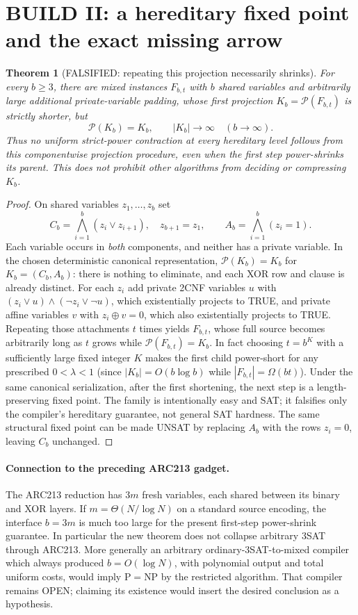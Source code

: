 \documentclass[11pt]{article}
\newtheorem{theorem}{Theorem}
\begin{document}
\section{BUILD II: a hereditary fixed point and the exact missing arrow}
\begin{theorem}[FALSIFIED: repeating this projection necessarily shrinks]
For every $b\ge3$, there are mixed instances $F_{b,t}$ with $b$ shared variables and arbitrarily large additional private-variable padding, whose first projection $K_b=\mathcal P(F_{b,t})$ is strictly shorter, but
\[
 \mathcal P(K_b)=K_b,\qquad |K_b|\longrightarrow\infty\quad(b\to\infty).
\]
Thus no uniform strict-power contraction at \emph{every hereditary level} follows from this componentwise projection procedure, even when the first step power-shrinks its parent. This does not prohibit other algorithms from deciding or compressing $K_b$.
\end{theorem}
\begin{proof}
On shared variables $z_1,\ldots,z_b$ set
\[
 C_b=\bigwedge_{i=1}^b(z_i\lor z_{i+1}),\quad z_{b+1}=z_1,
 \qquad A_b=\bigwedge_{i=1}^b(z_i=1).
\]
Each variable occurs in \emph{both} components, and neither has a private variable. In the chosen deterministic canonical representation, $\mathcal P(K_b)=K_b$ for $K_b=(C_b,A_b)$: there is nothing to eliminate, and each XOR row and clause is already distinct. For each $z_i$ add private 2CNF variables $u$ with $(z_i\lor u)\wedge(\neg z_i\lor\neg u)$, which existentially projects to TRUE, and private affine variables $v$ with $z_i\oplus v=0$, which also existentially projects to TRUE. Repeating those attachments $t$ times yields $F_{b,t}$, whose full source becomes arbitrarily long as $t$ grows while $\mathcal P(F_{b,t})=K_b$. In fact choosing $t=b^K$ with a sufficiently large fixed integer $K$ makes the first child power-short for any prescribed $0<\lambda<1$ (since $|K_b|=O(b\log b)$ while $|F_{b,t}|=\Omega(bt)$). Under the same canonical serialization, after the first shortening, the next step is a length-preserving fixed point. The family is intentionally easy and SAT; it falsifies only the compiler's hereditary guarantee, not general SAT hardness. The same structural fixed point can be made UNSAT by replacing $A_b$ with the rows $z_i=0$, leaving $C_b$ unchanged.
\end{proof}

\paragraph{Connection to the preceding ARC213 gadget.} The ARC213 reduction has $3m$ fresh variables, each shared between its binary and XOR layers. If $m=\Theta(N/\log N)$ on a standard source encoding, the interface $b=3m$ is much too large for the present first-step power-shrink guarantee. In particular the new theorem does not collapse arbitrary 3SAT through ARC213. More generally an arbitrary ordinary-3SAT-to-mixed compiler which always produced $b=O(\log N)$, with polynomial output and total uniform costs, would imply P$=$NP by the restricted algorithm. That compiler remains OPEN; claiming its existence would insert the desired conclusion as a hypothesis.
\end{document}
